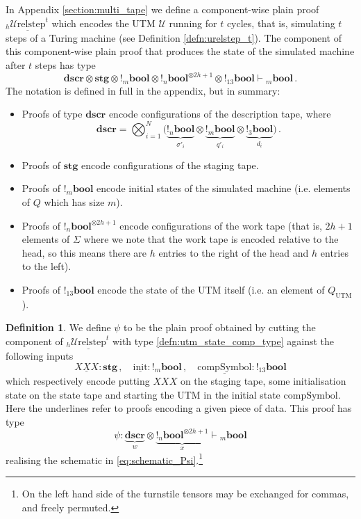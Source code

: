 \documentclass[english,letter paper,12pt,reqno]{article}
\theoremstyle{definition}
\newtheorem{definition}[theorem]{Definition}
\def\be{\begin{equation}}
\def\ee{\end{equation}}
\begin{document}
In Appendix \ref{section:multi_tape} we define a component-wise plain proof ${}_h\underline{\text{$\mathcal{U}$relstep}}^t$ which encodes the UTM $\mathcal{U}$ running for $t$ cycles, that is, simulating $t$ steps of a Turing machine (see Definition \ref{defn:urelstep_t}). The component of this component-wise plain proof that produces the state of the simulated machine after $t$ steps has type
\be\label{defn:utm_state_comp_type}
\textbf{dscr} \otimes \textbf{stg} \otimes {!}{}_m\textbf{bool} \otimes {!}{}_n\textbf{bool}^{\otimes 2h+1}\otimes {!}{}_{13}\textbf{bool} \vdash {}_m\textbf{bool}\,.
\ee
The notation is defined in full in the appendix, but in summary:
\begin{itemize}
    \item Proofs of type $\textbf{dscr}$ encode configurations of the description tape, where
    \begin{equation}
    \textbf{dscr} = \bigotimes_{i = 1}^{N}\Big( \underset{\sigma'_i}{\underbrace{{!}_n\textbf{bool}}} \otimes \underset{q'_i}{\underbrace{{!}_m\textbf{bool}}} \otimes \underset{d_i}{\underbrace{{!}_3\textbf{bool}}} \Big)\,.
\end{equation}
    \item Proofs of $\textbf{stg}$ encode configurations of the staging tape.
    \item Proofs of ${!}{}_m\textbf{bool}$ encode initial states of the simulated machine (i.e. elements of $Q$ which has size $m$).
    \item Proofs of ${!}{}_n\textbf{bool}^{\otimes 2h + 1}$ encode configurations of the work tape (that is, $2h + 1$ elements of $\Sigma$ where we note that the work tape is encoded relative to the head, so this means there are $h$ entries to the right of the head and $h$ entries to the left).
    \item Proofs of ${!}{}_{13}\textbf{bool}$ encode the state of the UTM itself (i.e. an element of $Q_{\text{UTM}}$).
\end{itemize}

\begin{definition}
We define $\psi$ to be the plain proof obtained by cutting the component of ${}_h\underline{\text{$\mathcal{U}$relstep}}^t$ with type \eqref{defn:utm_state_comp_type} against the following inputs
\[
\underline{XXX}: \textbf{stg}\,, \quad \underline{\text{init}}: {!}{}_m\textbf{bool}\,, \quad \underline{\text{compSymbol}} : {!}{}_{13}\textbf{bool}
\]
which respectively encode putting $XXX$ on the staging tape, some initialisation state on the state tape and starting the UTM in the initial state $\text{compSymbol}$. Here the underlines refer to proofs encoding a given piece of data. This proof has type
\[
\psi: \underset{w}{\underbrace{\textbf{dscr}}} \otimes \underset{x}{\underbrace{{!}{}_n\textbf{bool}^{\otimes 2h+1}}} \vdash {}_m\textbf{bool}
\]
realising the schematic in \eqref{eq:schematic_Psi}.\footnote{On the left hand side of the turnstile tensors may be exchanged for commas, and freely permuted.}
\end{definition}
\end{document}
